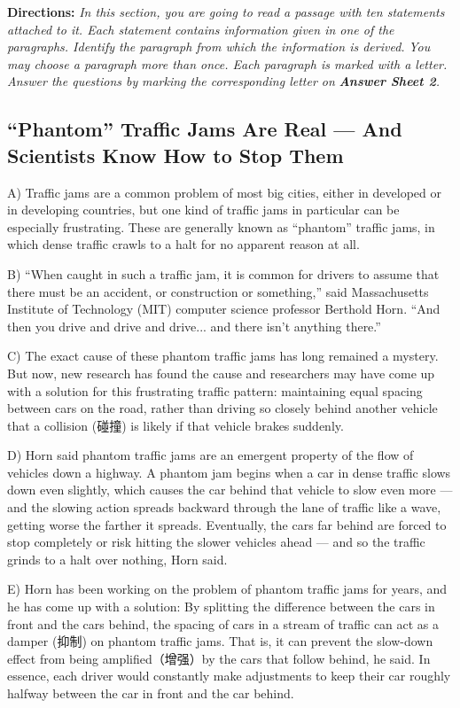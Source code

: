 \documentclass[UTF8,11pt]{ctexart}
\begin{document}
\textbf{Directions:} \textit{In this section, you are going to read a passage with ten statements attached to it. Each statement} \textit{contains information given in one of the paragraphs. Identify the paragraph from which the information is derived.} \textit{You may choose a paragraph more than once. Each paragraph is marked with a letter. Answer the questions by} \textit{marking the corresponding letter on }\textbf{\textit{Answer Sheet 2}}\textit{.}


\subsection*{\textbf{“Phantom” Traffic Jams Are Real} — \textbf{And Scientists Know How to Stop Them}}


A) Traffic jams are a common problem of most big cities, either in developed or in developing countries, but one kind of traffic jams in particular can be especially frustrating. These are generally known as “phantom” traffic jams, in which dense traffic crawls to a halt for no apparent reason at all.


B) “When caught in such a traffic jam, it is common for drivers to assume that there must be an accident, or construction or something,” said Massachusetts Institute of Technology (MIT) computer science professor Berthold Horn. “And then you drive and drive and drive... and there isn’t anything there.”


C) The exact cause of these phantom traffic jams has long remained a mystery. But now, new research has found the cause and researchers may have come up with a solution for this frustrating traffic pattern: maintaining equal spacing between cars on the road, rather than driving so closely behind another vehicle that a collision (碰撞) is likely if that vehicle brakes suddenly.


D) Horn said phantom traffic jams are an emergent property of the flow of vehicles down a highway. A phantom jam begins when a car in dense traffic slows down even slightly, which causes the car behind that vehicle to slow even more — and the slowing action spreads backward through the lane of traffic like a wave, getting worse the farther it spreads. Eventually, the cars far behind are forced to stop completely or risk hitting the slower vehicles ahead — and so the traffic grinds to a halt over nothing, Horn said.


E) Horn has been working on the problem of phantom traffic jams for years, and he has come up with a solution: By splitting the difference between the cars in front and the cars behind, the spacing of cars in a stream of traffic can act as a damper (抑制) on phantom traffic jams. That is, it can prevent the slow-down effect from being amplified（增强）by the cars that follow behind, he said. In essence, each driver would constantly make adjustments to keep their car roughly halfway between the car in front and the car behind.
\end{document}
